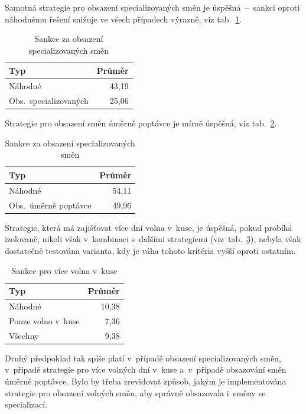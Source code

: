 \documentclass[twoside]{ctuthesis}
\begin{document}
Samotná strategie pro obsazení specializovaných směn je úspěšná~–~sankci oproti náhodnému řešení snižuje ve všech případech výrazně, viz tab.~\ref{tab:specialized}.

\begin{table}[h]
	\caption{Sankce za obsazení specializovaných směn}
	\label{tab:specialized}
	\begin{tabular}{lr}
		\hline
		\textbf{Typ} & \textbf{Průměr}\\
		\hline
		\rowcolor{Gray}
		Náhodné & 43,19\\
		Obs.~specializovaných & 25,06 \\
		\hline
	\end{tabular}
\end{table}

Strategie pro obsazení směn úměrně poptávce je mírně úspěšná, viz tab.~\ref{tab:demand}.

\begin{table}[h]
	\caption{Sankce za obsazení specializovaných směn}
	\label{tab:demand}
	\begin{tabular}{lr}
		\hline
		\textbf{Typ} & \textbf{Průměr}\\
		\hline
		\rowcolor{Gray}
		Náhodné & 54,11\\
		Obs.~úměrně poptávce & 49,96 \\
		\hline
	\end{tabular}
\end{table}

Strategie, která má zajišťovat více dní volna v~kuse, je úspěšná, pokud probíhá izolovaně, nikoli však v~kombinaci s~dalšími strategiemi (viz~tab.~\ref{tab:free}), nebyla však dostatečně testována varianta, kdy je váha tohoto kritéria vyšší oproti ostatním.

\begin{table}[h]
	\caption{Sankce pro více volna v~kuse}
	\label{tab:free}
	\begin{tabular}{lr}
		\hline
		\textbf{Typ} & \textbf{Průměr}\\
		\hline
		\rowcolor{Gray}
		Náhodné & 10,38\\
		Pouze volno v~kuse & 7,36 \\
		\rowcolor{Gray}
		Všechny & 9,38\\
		\hline
	\end{tabular}
\end{table}


Druhý předpoklad tak spíše platí v~případě obsazení specializovaných směn, v~případě strategie pro více volných dní v~kuse a~v~případě obsazování směn úměrně poptávce. Bylo by třeba zrevidovat způsob, jakým je implementována strategie pro obsazení volných směn, aby správně obsazovala i~směny se specializací.%
\end{document}
